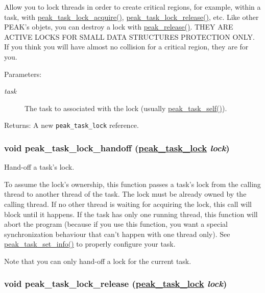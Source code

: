 Allow you to lock threads in order to create critical regions, for example, within a task, with \hyperlink{group__task__sync_ga4}{peak\_\-task\_\-lock\_\-acquire()}, \hyperlink{group__task__sync_ga6}{peak\_\-task\_\-lock\_\-release()}, etc. Like other PEAK's objets, you can destroy a lock with \hyperlink{group__alloc_ga7}{peak\_\-release()}. THEY ARE ACTIVE LOCKS FOR SMALL DATA STRUCTURES PROTECTION ONLY. If you think you will have almost no collision for a critical region, they are for you.

\begin{Desc}
\item[Parameters:]
\begin{description}
\item[{\em task}]The task to associated with the lock (usually \hyperlink{group__task__common_ga8}{peak\_\-task\_\-self()}).\end{description}
\end{Desc}
\begin{Desc}
\item[Returns:]A new {\tt peak\_\-task\_\-lock} reference. \end{Desc}
\hypertarget{group__task__sync_ga7}{
\subsubsection[peak\_\-task\_\-lock\_\-handoff]{\setlength{\rightskip}{0pt plus 5cm}void peak\_\-task\_\-lock\_\-handoff (\hyperlink{group__task__sync_ga0}{peak\_\-task\_\-lock} {\em lock})}}
\label{group__task__sync_ga7}


Hand-off a task's lock. 

To assume the lock's ownership, this function passes a task's lock from the calling thread to another thread of the task. The lock must be already owned by the calling thread. If no other thread is waiting for acquiring the lock, this call will block until it happens. If the task has only one running thread, this function will abort the program (because if you use this function, you want a special synchronization behaviour that can't happen with one thread only). See \hyperlink{group__task__common_ga17}{peak\_\-task\_\-set\_\-info()} to properly configure your task.\par
 Note that you can only hand-off a lock for the current task. \hypertarget{group__task__sync_ga6}{
\subsubsection[peak\_\-task\_\-lock\_\-release]{\setlength{\rightskip}{0pt plus 5cm}void peak\_\-task\_\-lock\_\-release (\hyperlink{group__task__sync_ga0}{peak\_\-task\_\-lock} {\em lock})}}
\label{group__task__sync_ga6}


